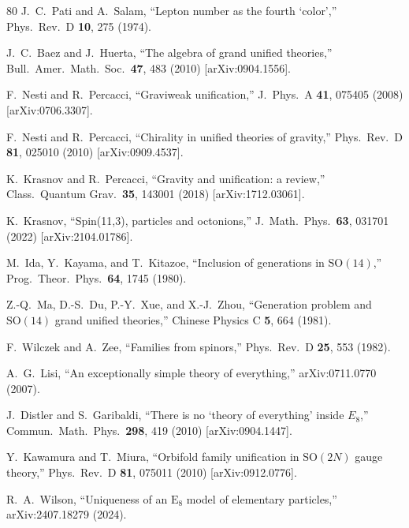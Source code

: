 \documentclass[aps,prd,twocolumn,showpacs,preprintnumbers,superscriptaddress,floatfix]{revtex4-2}
\begin{document}
\begin{thebibliography}{80}
J.~C.~Pati and A.~Salam,
``Lepton number as the fourth `color',''
Phys.\ Rev.\ D \textbf{10}, 275 (1974).

J.~C.~Baez and J.~Huerta,
``The algebra of grand unified theories,''
Bull.\ Amer.\ Math.\ Soc.\ \textbf{47}, 483 (2010)
[arXiv:0904.1556].


F.~Nesti and R.~Percacci,
``Graviweak unification,''
J.\ Phys.\ A \textbf{41}, 075405 (2008)
[arXiv:0706.3307].

F.~Nesti and R.~Percacci,
``Chirality in unified theories of gravity,''
Phys.\ Rev.\ D \textbf{81}, 025010 (2010)
[arXiv:0909.4537].

K.~Krasnov and R.~Percacci,
``Gravity and unification: a review,''
Class.\ Quantum Grav.\ \textbf{35}, 143001 (2018)
[arXiv:1712.03061].

K.~Krasnov,
``Spin(11,3), particles and octonions,''
J.\ Math.\ Phys.\ \textbf{63}, 031701 (2022)
[arXiv:2104.01786].


M.~Ida, Y.~Kayama, and T.~Kitazoe,
``Inclusion of generations in $\mathrm{SO}(14)$,''
Prog.\ Theor.\ Phys.\ \textbf{64}, 1745 (1980).

Z.-Q.~Ma, D.-S.~Du, P.-Y.~Xue, and X.-J.~Zhou,
``Generation problem and $\mathrm{SO}(14)$ grand unified theories,''
Chinese Physics C \textbf{5}, 664 (1981).

F.~Wilczek and A.~Zee,
``Families from spinors,''
Phys.\ Rev.\ D \textbf{25}, 553 (1982).


A.~G.~Lisi,
``An exceptionally simple theory of everything,''
arXiv:0711.0770 (2007).

J.~Distler and S.~Garibaldi,
``There is no `theory of everything' inside $E_8$,''
Commun.\ Math.\ Phys.\ \textbf{298}, 419 (2010)
[arXiv:0904.1447].


Y.~Kawamura and T.~Miura,
``Orbifold family unification in $\mathrm{SO}(2N)$ gauge theory,''
Phys.\ Rev.\ D \textbf{81}, 075011 (2010)
[arXiv:0912.0776].

R.~A.~Wilson,
``Uniqueness of an $\mathrm{E}_8$ model of elementary particles,''
arXiv:2407.18279 (2024).


\end{thebibliography}
\end{document}
